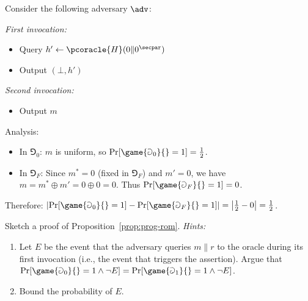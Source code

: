 \ifsolutions
\begin{mysolution}
  Consider the following adversary $\adv$:
  
  \emph{First invocation:}
  \begin{itemize}
    \item Query $h' \gets \pcoracle{H}(0 \| 0^\secpar)$
    \item Output $(\bot, h')$
  \end{itemize}
  
  \emph{Second invocation:}
  \begin{itemize}
    \item Output $m$
  \end{itemize}
  
  Analysis:
  \begin{itemize}
    \item In $\Game_0$: $m$ is uniform, so $\Pr[\game{\Game_0}{} = 1] = \frac{1}{2}$.
    \item In $\Game_F$: Since $m^* = 0$ (fixed in $\Game_F$) and $m' = 0$, we have $m = m^* \oplus m' = 0 \oplus 0 = 0$. Thus $\Pr[\game{\Game_F}{} = 1] = 0$.
  \end{itemize}
  
  Therefore: $\left|\Pr[\game{\Game_0}{} = 1] - \Pr[\game{\Game_F}{} = 1]\right| = \left|\frac{1}{2} - 0\right| = \frac{1}{2}$.
\end{mysolution}
\fi

\begin{exercise}\label{ex:prog-rom}
  Sketch a proof of Proposition~\ref{prop:prog-rom}.
  \emph{Hints:}
  \begin{enumerate}
    \item Let $E$ be the event that the adversary queries $m \| r$ to the oracle during its first invocation (i.e., the event that triggers the assertion).
    Argue that $\Pr[\game{\Game_0}{} = 1 \wedge \neg E] = \Pr[\game{\Game_1}{} = 1 \wedge \neg E]$.
    \item Bound the probability of $E$.
  \end{enumerate}
\end{exercise}

